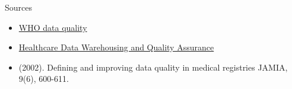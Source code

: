 \documentclass[10pt, xcolor=table]{beamer}
\begin{document}
\begin{frame}{Sources}
	\begin{itemize}
		\item \href{http://www.globalhealthworkforce.org/resources/who_improving_data_quality.pdf}{WHO data quality}
		\item \href{https://pdfs.semanticscholar.org/f68b/1f61568a15791dbc6f308ba73d39836fb47e.pdf}{Healthcare Data Warehousing and Quality Assurance}
		\item (2002). Defining and improving data quality in medical registries JAMIA, 9(6), 600-611.
	\end{itemize}

\end{frame}


\end{document}
